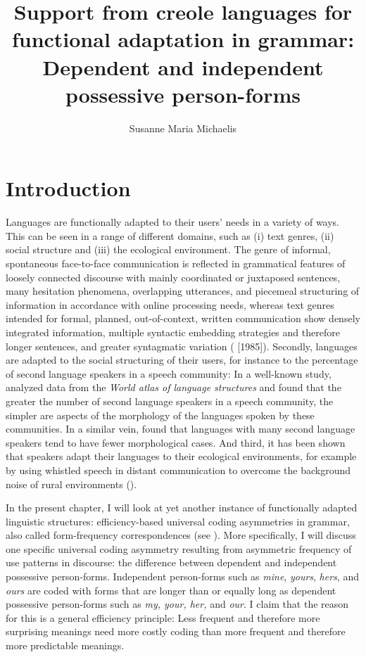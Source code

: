 \documentclass[output=paper]{langsci/langscibook}
\author{Susanne Maria Michaelis\affiliation{Leipzig University \& Max Planck Institute for the Science of Human History (Jena)}}
\title{Support from creole languages for functional adaptation in grammar: Dependent and independent possessive person-forms}
\begin{document}
\maketitle 




\section{Introduction}

Languages are functionally adapted to their users’ needs in a variety of ways. This can be seen in a range of different domains, such as (i) text genres, (ii) social structure and (iii) the ecological environment. The genre of informal, spontaneous face-to-face communication is reflected in grammatical features of loosely connected discourse with mainly coordinated or juxtaposed sentences, many hesitation phenomena, overlapping utterances, and piecemeal structuring of information in accordance with online processing needs, whereas text genres intended for formal, planned, out-of-context, written communication show densely integrated information, multiple syntactic embedding strategies and therefore longer sentences, and greater syntagmatic variation (\citealt{KochOesterreicher2012} [1985]). Secondly, languages are adapted to the social structuring of their users, for instance to the percentage of second language speakers in a speech community: In a well-known study, \citet{LupyanDale2010} analyzed data from the \textit{World atlas of language structures} \citep{HaspelmathEtAl2005} and found that the greater the number of second language speakers in a speech community, the simpler are aspects of the morphology of the languages spoken by these communities. In a similar vein, \citet{BentzWinter2013} found that languages with many second language speakers tend to have fewer morphological cases. And third, it has been shown that speakers adapt their languages to their ecological environments, for example by using whistled speech in distant communication to overcome the background noise of rural environments (\citealt{Meyer2005,Meyer2008}). 

In the present chapter, I will look at yet another instance of functionally adapted linguistic structures: efficiency-based universal coding asymmetries in grammar, also called form-frequency correspondences (see ). More specifically, I will discuss one specific universal coding asymmetry resulting from asymmetric frequency of use patterns in discourse: the difference between dependent and independent possessive person-forms. Independent person-forms such as \textit{mine}, \textit{yours}, \textit{hers}, and \textit{ours} are coded with forms that are longer than or equally long as dependent possessive person-forms such as \textit{my, your, her,} and \textit{our}. I claim that the reason for this is a general efficiency principle: Less frequent and therefore more surprising meanings need more costly coding than more frequent and therefore more predictable meanings. 
\end{document}
